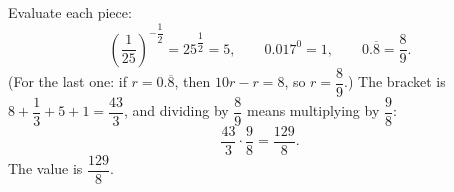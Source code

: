Evaluate each piece:
\[
\left(\dfrac{1}{25}\right)^{-\dfrac{1}{2}}=25^{\dfrac{1}{2}}=5,\qquad 0.017^0=1,\qquad 0.\overline{8}=\dfrac{8}{9} .
\]
(For the last one: if $r=0.\overline8$, then $10r-r=8$, so $r=\dfrac{8}{9}$.) The bracket is $8+\dfrac{1}{3}+5+1=\dfrac{43}{3}$, and dividing by $\dfrac{8}{9}$ means multiplying by $\dfrac{9}{8}$:
\[
\dfrac{43}{3}\cdot\dfrac{9}{8}=\dfrac{129}{8}.
\]
The value is $\boxed{\dfrac{129}{8}}$.
